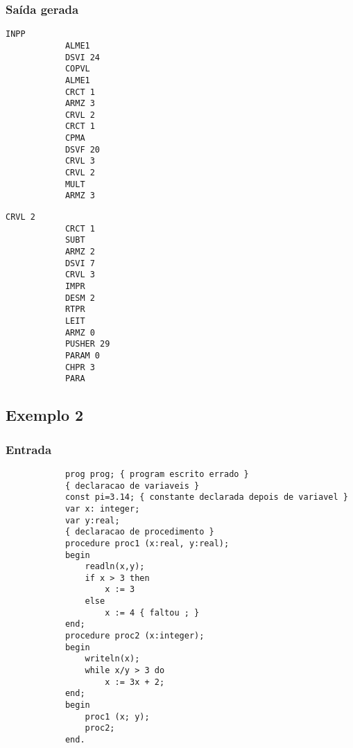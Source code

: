 \documentclass{article}
\begin{document}
		\subsubsection*{Saída gerada} %
		\label{ssub:sa_da_gerada}
			\begin{center}
			\begin{minipage}[t]{0.4\textwidth}
			\begin{lstlisting}[firstnumber=0]
			INPP
			ALME1
			DSVI 24
			COPVL
			ALME1
			CRCT 1
			ARMZ 3
			CRVL 2
			CRCT 1
			CPMA
			DSVF 20
			CRVL 3
			CRVL 2
			MULT
			ARMZ 3
			\end{lstlisting}
			\end{minipage}
			\begin{minipage}[t]{0.4\textwidth}
			\begin{lstlisting}[firstnumber=15]
			CRVL 2
			CRCT 1
			SUBT
			ARMZ 2
			DSVI 7
			CRVL 3
			IMPR
			DESM 2
			RTPR
			LEIT
			ARMZ 0
			PUSHER 29
			PARAM 0
			CHPR 3
			PARA
			\end{lstlisting}
			\end{minipage}
			\end{center}

	\subsection{Exemplo 2} %
	\label{sub:exemplo_2}

		\subsubsection*{Entrada} %
		\label{ssub:entrada}
		\begin{lstlisting}
			prog prog; { program escrito errado }
			{ declaracao de variaveis }
			const pi=3.14; { constante declarada depois de variavel }
			var x: integer;
			var y:real;
			{ declaracao de procedimento }
			procedure proc1 (x:real, y:real);
			begin
				readln(x,y);
				if x > 3 then
					x := 3
				else
					x := 4 { faltou ; }
			end;
			procedure proc2 (x:integer);
			begin
				writeln(x);
				while x/y > 3 do
					x := 3x + 2;
			end;
			begin
				proc1 (x; y);
				proc2;
			end.
		\end{lstlisting}
\end{document}
